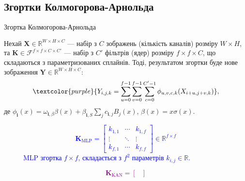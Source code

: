 \documentclass{zkdl-presentation-template}
\begin{document}
    \subsection{Згортки Колмогорова-Арнольда}
    \begin{frame}[fragile]{Згортка Колмогорова-Арнольда}
        \begin{definition}
            Нехай $\boldsymbol{X} \in \mathbb{R}^{W \times H \times C}$ --- набір з $C$
            зображень (кількість каналів) розміру $W \times H$, та $\boldsymbol{K} \in
            \mathcal{F}^{f \times f \times C \times C'}$ --- набір з $C'$ фільтрів
            (ядер) розміру $f \times f \times C$, що складаються з параметризованих
            сплайнів. Тоді, результатом згортки буде нове зображення $\boldsymbol{Y} \in
            \mathbb{R}^{W \times H \times C}$:
            \begin{equation*}
                \textcolor{purple}{Y_{i,j,k} = \sum_{u=0}^{f-1} \sum_{v=0}^{f-1} \sum_{c=0}^{C'-1} \phi_{u,v,c,k}(X_{i+u,j+v,k})},
            \end{equation*}
            де $\phi_{\boldsymbol{i}}(x) =
            \omega_{\boldsymbol{i},\beta}\beta(x)+\beta_{\boldsymbol{i},S}
            \sum_j c_{\boldsymbol{i},j}B_j(x)$, $\beta(x)=x\sigma(x)$.
        \end{definition}
        \vspace{-10px}
        \scriptsize\begin{figure}
        \noindent
            \begin{minipage}{0.48\linewidth}
            \textcolor{blue}{
            \begin{equation*}
            \boldsymbol{K}_{\text{MLP}} = \begin{bmatrix}
                k_{1,1} & \cdots & k_{1,f} \\
                \vdots & \ddots & \vdots \\
                k_{f,1} & \cdots & k_{f,f}
            \end{bmatrix} \in \mathbb{R}^{f \times f}
            \end{equation*}
            MLP згортка $f \times f$, складається з $f^2$ параметрів $k_{i,j} \in \mathbb{R}$.}
            \end{minipage}
            \hfill
            \begin{minipage}{0.48\linewidth}
            \textcolor{purple}{
            \begin{equation*}
            \boldsymbol{K}_{\text{KAN}} = \begin{bmatrix}

\end{bmatrix}
\end{equation*}}
\end{minipage}
\end{figure}
\end{frame}
\end{document}
